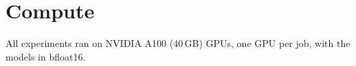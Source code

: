\documentclass{article}
\newcommand{\phle}{PHLE\xspace}
\begin{document}
\begin{table}[h]
  \centering
  \caption{The third-person description compared with the self-introduction framing of the same hypotheses, scored on the same answers (Olmo base \phle). AUC per answer / $k=10$ / $k=30$, 100 bootstrap replicates.}
  \label{tab:framings}
  
\end{table}
\begin{table}[h]
  \centering
  \caption{Six-way identification (text) for the two framings, raw and with per-hypothesis offsets estimated on a disjoint half of the questions. Chance is $1/6$.}
  \label{tab:framings_sixway}
  
\end{table}

\section{Compute}
\label{app:compute}

All experiments ran on NVIDIA A100 (40\,GB) GPUs, one GPU per job, with the models in bfloat16.
\end{document}
